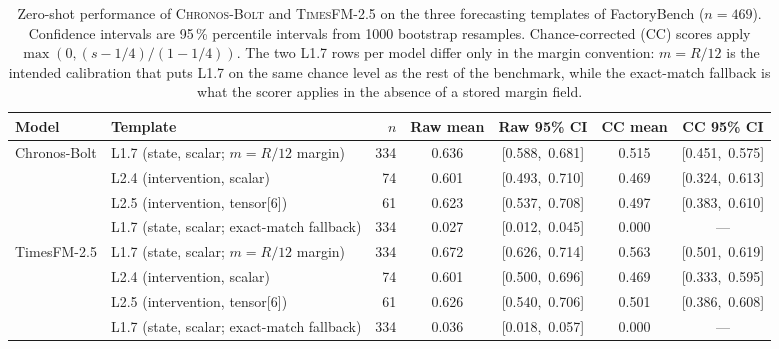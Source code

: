 \begin{table}[htbp]
    \centering
    \caption{Zero-shot performance of \textsc{Chronos-Bolt} and \textsc{TimesFM-2.5} on the three forecasting templates of FactoryBench ($n=469$). Confidence intervals are 95\,\% percentile intervals from 1000 bootstrap resamples. Chance-corrected (CC) scores apply $\max(0,(s-1/4)/(1-1/4))$. The two L1.7 rows per model differ only in the margin convention: $m=R/12$ is the intended calibration that puts L1.7 on the same chance level as the rest of the benchmark, while the exact-match fallback is what the scorer applies in the absence of a stored margin field.}
    \label{tab:chronos-results}
    \small
    \begin{tabular}{@{}llr cc cc@{}}
        \toprule
        Model        & Template                                        & $n$ & Raw mean & Raw 95\% CI       & CC mean & CC 95\% CI        \\
        \midrule
        Chronos-Bolt & L1.7 (state, scalar; $m=R/12$ margin)           & 334 & 0.636    & [0.588,\ 0.681]   & 0.515   & [0.451,\ 0.575]   \\
                     & L2.4 (intervention, scalar)                     &  74 & 0.601    & [0.493,\ 0.710]   & 0.469   & [0.324,\ 0.613]   \\
                     & L2.5 (intervention, tensor[6])                  &  61 & 0.623    & [0.537,\ 0.708]   & 0.497   & [0.383,\ 0.610]   \\
                     & L1.7 (state, scalar; exact-match fallback)      & 334 & 0.027    & [0.012,\ 0.045]   & 0.000   & ---               \\
        \midrule
        TimesFM-2.5  & L1.7 (state, scalar; $m=R/12$ margin)           & 334 & 0.672    & [0.626,\ 0.714]   & 0.563   & [0.501,\ 0.619]   \\
                     & L2.4 (intervention, scalar)                     &  74 & 0.601    & [0.500,\ 0.696]   & 0.469   & [0.333,\ 0.595]   \\
                     & L2.5 (intervention, tensor[6])                  &  61 & 0.626    & [0.540,\ 0.706]   & 0.501   & [0.386,\ 0.608]   \\
                     & L1.7 (state, scalar; exact-match fallback)      & 334 & 0.036    & [0.018,\ 0.057]   & 0.000   & ---               \\
        \bottomrule
    \end{tabular}
\end{table}

